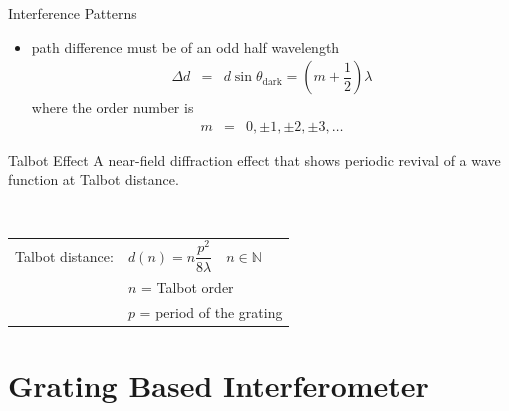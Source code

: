 \begin{frame}[c]{Interference Patterns}
    \begin{itemize}
        \item {} path difference must be of an odd half wavelength
              \begin{eqnarray*}
                  \Delta d &=& d\sin\theta_{\text{dark}}= \left(m + \dfrac{1}{2}\right)\lambda
              \end{eqnarray*}
              where the order number is
              \begin{eqnarray*}
                  m &=& 0,\pm 1, \pm 2, \pm 3,\ldots
              \end{eqnarray*}
    \end{itemize}
\end{frame}

\begin{frame}{Talbot Effect}
    A near-field diffraction effect that shows periodic revival of a wave function at Talbot distance.

     \\
    \begin{tabular}{ll}
        Talbot distance: & $d(n) = n\dfrac{p^2}{8\lambda} \quad n \in \mathbb N$ \\
                         & $n$ = Talbot order                                    \\
                         & $p$ = period of the grating
    \end{tabular}
\end{frame}


\section{Grating Based Interferometer}

